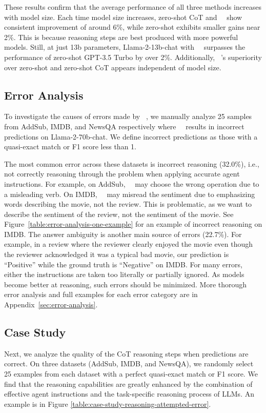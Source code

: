 These results confirm that the average performance of all three methods increases with model size. Each time model size increases, zero-shot CoT and \zeroshotmid\ \method\ show consistent improvement of around 6\%, while zero-shot exhibits smaller gains near 2\%. This is because reasoning steps are best produced with more powerful models. Still, at just 13b parameters, Llama-2-13b-chat with \zeroshotmid\ \method\ surpasses the performance of zero-shot GPT-3.5 Turbo by over 2\%. Additionally, \zeroshotmid\ \method's superiority over zero-shot and zero-shot CoT appears independent of model size. 

\vspace{2pt}
\subsection{Error Analysis}
To investigate the causes of errors made by \zeroshotmid\ \method, we manually analyze 25 samples from AddSub, IMDB, and NewsQA respectively where \zeroshotmid\ \method\ results in incorrect predictions on Llama-2-70b-chat. We define incorrect predictions as those with a quasi-exact match or F1 score less than 1. 

The most common error across these datasets is incorrect reasoning (32.0\%), i.e., not correctly reasoning through the problem when applying accurate agent instructions. For example, on AddSub, \zeroshotmid\ \method\ may choose the wrong operation due to a misleading verb. On IMDB, \zeroshotmid\ \method\ may misread the sentiment due to emphasizing words describing the movie, not the review. This is problematic, as we want to describe the sentiment of the review, not the sentiment of the movie. See Figure~\ref{table:error-analysis-one-example} for an example of incorrect reasoning on IMDB. The answer ambiguity is another main source of errors (22.7\%). For example, in a review where the reviewer clearly enjoyed the movie even though the reviewer acknowledged it was a typical bad movie, our prediction is ``Positive'' while the ground truth is ``Negative'' on IMDB. For many errors, either the instructions are taken too literally or partially ignored. As models become better at reasoning, such errors should be minimized. More thorough error analysis and full examples for each error category are in Appendix~\ref{sec:error-analysis}.



\subsection{Case Study}
Next, we analyze the quality of the CoT reasoning steps when predictions are correct. On three datasets (AddSub, IMDB, and NewsQA), we randomly select 25 examples from each dataset with a perfect quasi-exact match or F1 score. We find that the reasoning capabilities are greatly enhanced by the combination of effective agent instructions and the task-specific reasoning process of LLMs. An example is in Figure \ref{table:case-study-reasoning-attempted-error}.


